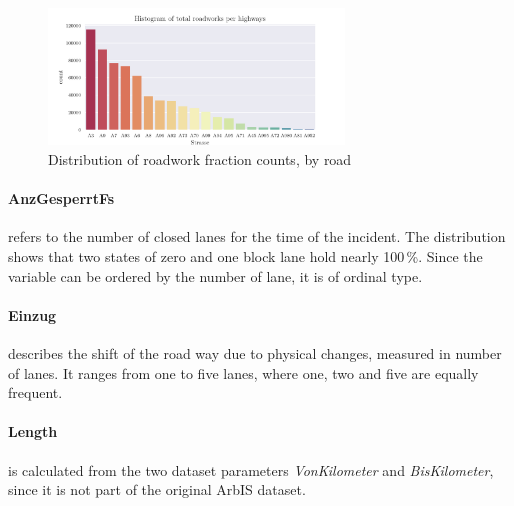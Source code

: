 \begin{figure}[ht]
	\centering
	\includegraphics[width=0.7\textwidth]{../CorrAnalysis/data/ArbIS/01_dataset/plots/arbis_dataset_hist_highway}
	\caption{Distribution of roadwork fraction counts, by road}
	\label{img:arbis_dataset_dist_highway}
\end{figure}

\pagebreak

\paragraph{AnzGesperrtFs} refers to the number of closed lanes for the time of the incident. The distribution shows that two states of zero and one block lane hold nearly 100\,\%. Since the variable can be ordered by the number of lane, it is of ordinal type.

\paragraph{Einzug} describes the shift of the road way due to physical changes, measured in number of lanes. It ranges from one to five lanes, where one, two and five are equally frequent. 

\paragraph{Length} is calculated from the two dataset parameters \textit{VonKilometer} and \textit{BisKilometer}, since it is not part of the original ArbIS dataset. 


